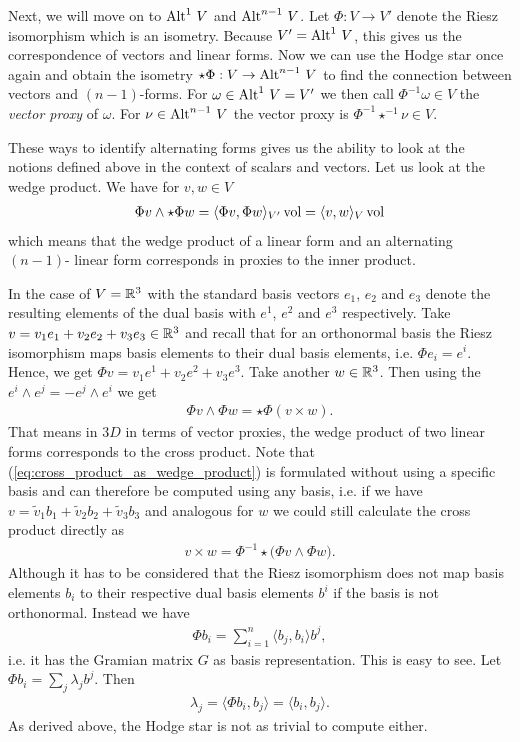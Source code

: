 \documentclass[../master_thesis.tex]{subfiles}
\begin{document}
Next, we will move on to ${\operatorname{Alt}^{1}\,V}$ and ${\operatorname{Alt}^{n-1}\,V}$. 
Let $\Phi: V \rightarrow V'$ denote the Riesz isomorphism which is an isometry.
Because $V' = {\operatorname{Alt}^{1}\,V}$, this gives us the correspondence of 
vectors and linear forms. Now we can use the Hodge star once again and obtain 
the isometry $\star \Phi: V \rightarrow {\operatorname{Alt}^{n-1}\,V}$ to find the connection 
between vectors and $(n-1)$-forms. 
For $\omega \in {\operatorname{Alt}^{1}\,V} = V'$ we then call 
$\Phi^{-1} \omega \in V$ the \textit{vector proxy} of $\omega$.
For $\nu \in {\operatorname{Alt}^{n-1}\,V}$ the vector proxy is 
$\Phi^{-1} \star^{-1} \nu \in V$.

These ways to identify alternating forms gives us the 
ability to look at the notions defined above in the context of scalars 
and vectors.
Let us look at the wedge product. We have for $v,w \in V$
\begin{align*}
    \Phi v \wedge \star \Phi w = \langle \Phi v , \Phi w \rangle_{V'} \operatorname{vol}
    = \langle v , w \rangle_{V} \operatorname{vol}
\end{align*}
which means that the wedge product of a linear form and an alternating $(n-1)$-
linear form corresponds in proxies to the inner product.

In the case of $V= \mathbb{R}^3$ with the standard basis
vectors $e_1$, $e_2$ and $e_3$ denote the resulting elements 
of the dual basis with $e^1$, $e^2$ and $e^3$ respectively. 
Take $v = v_1 e_1 + v_2 e_2 + v_3 e_3 \in \mathbb{R}^3$ 
and recall that for an orthonormal basis the Riesz isomorphism maps basis 
elements to their dual basis elements, i.e. $\Phi e_i = e^i$. Hence, 
we get $\Phi v = v_1 e^1 + v_2 e^2 + v_3 e^3$. Take another $w \in \mathbb{R}^3$.
Then using the $e^i \wedge e^j = - e^j \wedge e^i$ we get 
\begin{align}
    \Phi v \wedge \Phi w = \star \Phi (v \times w). 
    \label{eq:cross_product_as_wedge_product}
\end{align}
That means in $3D$ in terms of vector proxies, the wedge product 
of two linear forms corresponds to the cross product. Note that 
(\ref{eq:cross_product_as_wedge_product}) is formulated without using a 
specific basis and can therefore be computed using any basis, i.e. 
if we have $v = \tilde{v}_1 b_1 + \tilde{v}_2 b_2 + \tilde{v}_3 b_3$ 
and analogous for $w$ we could still calculate the cross product directly as 
\begin{align*}
    v \times w = \Phi^{-1} \star \big(\Phi v \wedge \Phi w \big).
\end{align*}
Although it has to be considered that the Riesz isomorphism does not map basis elements $b_i$ to their respective 
dual basis elements $b^i$ if the basis is not orthonormal. 
Instead we have 
\begin{align*}
    \Phi b_i = \sum_{i=1}^{n} \langle b_j, b_i \rangle b^j,
\end{align*}
i.e. it has the Gramian matrix $G$ as basis representation. 
This is easy to 
see. Let $\Phi b_i = \sum_j \lambda_j b^j$. Then
\begin{align*}
    \lambda_j = \langle \Phi b_i ,b_j \rangle = \langle b_i, b_j \rangle.
\end{align*}
As derived above, the Hodge star is not as trivial to compute either.
\end{document}
